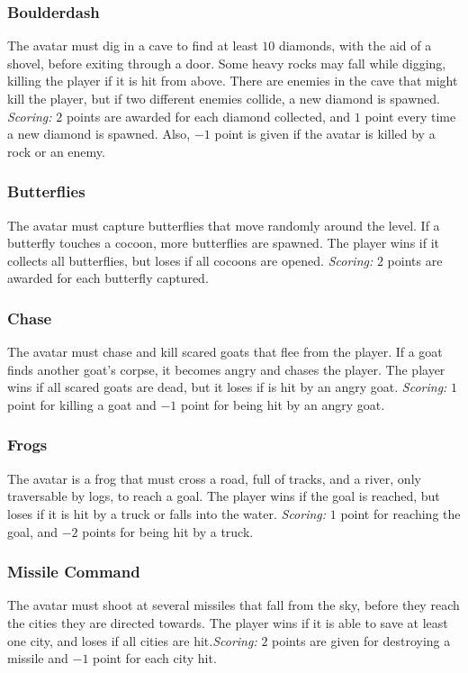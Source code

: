 \documentclass[conference]{IEEEtran}
\begin{document}
\subsubsection{Boulderdash} The avatar must dig in a cave to find at least $10$ diamonds, with the aid of a shovel, before exiting through a door. Some heavy rocks may fall while digging, killing the player if it is hit from above. There are enemies in the cave that might kill the player, but if two different enemies collide, a new diamond is spawned. \textit{Scoring:} $2$ points are awarded for each diamond collected, and $1$ point every time a new diamond is spawned. Also, $-1$ point is given if the avatar is killed by a rock or an enemy.

\subsubsection{Butterflies} The avatar must capture butterflies that move randomly around the level. If a butterfly touches a cocoon, more butterflies are spawned. The player wins if it collects all butterflies, but loses if all cocoons are opened. \textit{Scoring:} $2$ points are awarded for each butterfly captured. 

\subsubsection{Chase} The avatar must chase and kill scared goats that flee from the player. If a goat finds another goat's corpse, it becomes angry and chases the player. The player wins if all scared goats are dead, but it loses if is hit by an angry goat. \textit{Scoring:} $1$ point for killing a goat and $-1$ point for being hit by an angry goat.

\subsubsection{Frogs} The avatar is a frog that must cross a road, full of tracks, and a river, only traversable by logs, to reach a goal.  The player wins if the goal is reached, but loses if it is hit by a truck or falls into the water. \textit{Scoring:}  $1$ point for reaching the goal, and $-2$ points for being hit by a truck.

\subsubsection{Missile Command} The avatar must shoot at several missiles that fall from the sky, before they reach the cities they are directed towards. The player wins if it is able to save at least one city, and loses if all cities are hit.\textit{Scoring:} $2$ points are given for destroying a missile and $-1$ point for each city hit.
\end{document}
